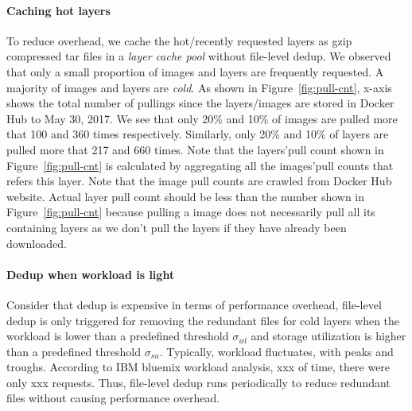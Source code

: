 \paragraph{Caching hot layers}To reduce overhead, we cache the hot/recently requested layers as gzip compressed tar files in a \textit{layer cache pool} without file-level dedup.
We observed that only a small proportion of images and layers are frequently requested. A majority of images and layers are \textit{cold}.
As shown in Figure~\ref{fig:pull-cnt}, x-axis shows the total number of pullings since the layers/images are stored in Docker Hub to May 30, 2017. 
We see that only 20\% and 10\% of images are pulled more that 100 and 360 times respectively. 
Similarly, only 20\% and 10\% of layers are pulled more that 217 and 660 times. 
Note that 
the layers'pull count shown in Figure~\ref{fig:pull-cnt} is calculated by aggregating all the images'pull counts that refers this layer.
Note that the image pull counts are crawled from Docker Hub website. 
Actual layer pull count should be less than the number shown in Figure~\ref{fig:pull-cnt} because pulling a image does not necessarily pull all its containing layers as we don't pull the layers if they have already been downloaded.
%

%
 
\paragraph{Dedup when workload is light}Consider that dedup is expensive in terms of performance overhead, file-level dedup is only triggered for removing the redundant files for cold layers when the workload is lower than a predefined threshold $\sigma_{wl}$ and storage utilization is higher than a predefined threshold $\sigma_{su}$. 
Typically, workload fluctuates, with peaks and troughs. According to IBM bluemix workload analysis\cite{xxx}, xxx of time, there were only xxx requests. %
Thus, file-level dedup runs periodically to reduce redundant files without causing performance overhead. 
%

